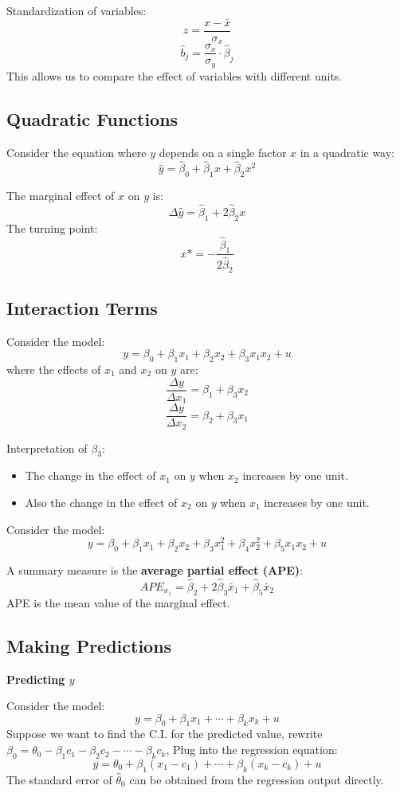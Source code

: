 \documentclass[11pt,a4paper]{article}
\begin{document}
Standardization of variables:
\[
z = \frac{x - \bar{x}}{\sigma_x}
\]
\[
\hat{b}_j = \frac{\sigma_x}{\sigma_y} \cdot \hat{\beta}_j
\]
This allows us to compare the effect of variables with different units.

\subsection{Quadratic Functions}
Consider the equation where $y$ depends on a single factor $x$ in a quadratic way:
\[
\hat{y} = \hat{\beta}_0 + \hat{\beta}_1 x + \hat{\beta}_2 x^2
\]

The marginal effect of $x$ on $y$ is:
\[
\Delta \hat{y} = \hat{\beta}_1 + 2 \hat{\beta}_2 x
\]
The turning point:
\[
x* = -\frac{\hat{\beta}_1}{2 \hat{\beta}_2}
\]

\subsection{Interaction Terms}
Consider the model:
\[
y = \beta_0 + \beta_1 x_1 + \beta_2 x_2 + \beta_3 x_1 x_2 + u
\]
where the effects of $x_1$ and $x_2$ on $y$ are:
\[
\frac{\Delta y}{\Delta x_1} = \beta_1 + \beta_3 x_2
\]
\[
\frac{\Delta y}{\Delta x_2} = \beta_2 + \beta_3 x_1
\]

Interpretation of $\beta_3$:
\begin{itemize}
    \item The change in the effect of $x_1$ on $y$ when $x_2$ increases by one unit.
    \item Also the change in the effect of $x_2$ on $y$ when $x_1$ increases by one unit.
\end{itemize}

Consider the model:
\[
y = \beta_0 + \beta_1 x_1 + \beta_2 x_2 + \beta_3 x_1^2 + \beta_4 x_2^2 + \beta_5 x_1 x_2 + u
\]

A summary measure is the \textbf{average partial effect (APE)}:
\[
APE_{x_1} = \hat{\beta}_2 + 2 \hat{\beta}_3 \bar{x}_1 + \hat{\beta}_5 \bar{x}_2
\] 
APE is the mean value of the marginal effect.

\subsection{Making Predictions}
\textbf{Predicting $y$} \par
Consider the model:
\[
y = \beta_0 + \beta_1 x_1 + \cdots + \beta_k x_k + u
\]
Suppose we want to find the C.I. for the predicted value, 
rewrite $\beta_0 = \theta_0 - \beta_1 c_1 - \beta_2 c_2 - \cdots - \beta_k c_k$,
Plug into the regression equation:
\[
y = \theta_0 + \beta_1 (x_1 - c_1) + \cdots + \beta_k (x_k - c_k) + u
\]
The standard error of $\hat{\theta}_0$ can be obtained from the regression output directly.
\end{document}

